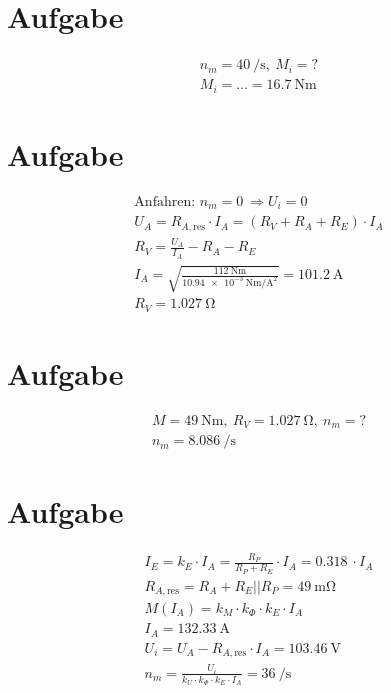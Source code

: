 \documentclass[10pt,a4paper]{article}
\begin{document}
\section{Aufgabe}
\begin{align*}
n_m = \SI{40}{\per\second},\ M_i = ?\\
M_i = \ldots = \SI{16.7}{\newton\meter}
\end{align*}

\section{Aufgabe}
\begin{align*}
\text{Anfahren: } n_m = 0\ \Rightarrow U_i = 0\\
U_A = R_{A,\text{res}} \cdot I_A = (R_V + R_A + R_E) \cdot I_A\\
R_V = \frac{U_A}{I_A} - R_A - R_E\\
I_A = \sqrt{\frac{\SI{112}{\newton\meter}}{\SI{10.94e-3}{\newton\meter\per\ampere\squared}}} = \SI{101.2}{\ampere}\\
R_V = \SI{1.027}{\ohm}
\end{align*}

\section{Aufgabe}
\begin{align*}
M = \SI{49}{\newton\meter},\ R_V = \SI{1.027}{\ohm},\ n_m = ?\\
n_m = \SI{8.086}{\per\second}
\end{align*}

\section{Aufgabe}
\begin{align*}
I_E = k_E \cdot I_A = \frac{R_P}{R_P + R_E} \cdot I_A = \SI{0.318}{} \cdot I_A\\
R_{A,\text{res}} = R_A + R_E || R_P = \SI{49}{\milli\ohm}\\
M(I_A) = k_M \cdot k_\Phi \cdot k_E \cdot I_A\\
I_A = \SI{132.33}{\ampere}\\
U_i = U_A - R_{A,\text{res}} \cdot I_A = \SI{103.46}{\volt}\\
n_m = \frac{U_i}{k_U \cdot k_\Phi \cdot k_E \cdot I_A} = \SI{36}{\per\second}
\end{align*}
\end{document}
